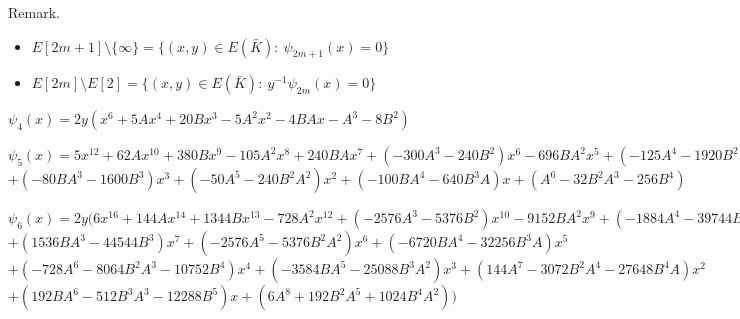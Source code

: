 \documentclass[12pt,handout]{beamer} %
\theoremstyle{definition}
\begin{document}
\begin{frame}
\begin{block}{Remark.}
\begin{itemize}
\item $E[2m+1]\setminus \{\infty\}= \{(x,y)\in E(\bar{K}):\  \psi_{2m+1}(x)=0\}$
\item $E[2m]\setminus E[2]= \{(x,y)\in E(\bar{K}):\  y^{-1}\psi_{2m}(x)=0\}$
\end{itemize}
\end{block}%
\pause
\begin{example}%
\tiny{
$
\psi_4(x)=2y(x^6
 + 5 A x^4
 + 20 B x^3
 - 5 A^2 x^2
 - 4 B A x
 -A^3
 - 8 B^2)$\bigskip
 
$
 \psi_5(x)=5 x^{12}
 + 62 A x^{10}
 + 380 B x^9
 - 105 A^2 x^8
 + 240 B A x^7
 + \left(-300 A^3
 - 240 B^2\right)  x^6
 - 696 B A^2 x^5
 + \left(-125 A^4
 - 1920 B^2 A\right)  x^4$
 $
 + \left(-80 B A^3
 - 1600 B^3\right)  x^3
 + \left(-50 A^5
 - 240 B^2 A^2\right)  x^2
 + \left(-100 B A^4
 - 640 B^3 A\right)  x
 + \left(A^6
 - 32 B^2 A^3
 - 256 B^4\right)$\bigskip
 
$
 \psi_6(x)=2y(
 6 x^{16}
 + 144 A x^{14}
 + 1344 B x^{13}
 - 728 A^2 x^{12}
 + \left(-2576 A^3
 - 5376 B^2\right)  x^{10}
 - 9152 B A^2 x^9
 + \left(-1884 A^4
 - 39744 B^2 A\right)  x^8$ $
 + \left(1536 B A^3
 - 44544 B^3\right)  x^7
 + \left(-2576 A^5
 - 5376 B^2 A^2\right)  x^6
 + \left(-6720 B A^4
 - 32256 B^3 A\right)  x^5$ $
 + \left(-728 A^6
 - 8064 B^2 A^3
 - 10752 B^4\right)  x^4
 + \left(-3584 B A^5
 - 25088 B^3 A^2\right)  x^3
 + \left(144 A^7
 - 3072 B^2 A^4
 - 27648 B^4 A\right)  x^2$ $
 + \left(192 B A^6
 - 512 B^3 A^3
 - 12288 B^5\right)  x
 + \left(6 A^8
 + 192 B^2 A^5
 + 1024 B^4 A^2\right))$}
\end{example}

\end{frame}


% 
% 
% 
\end{document}

